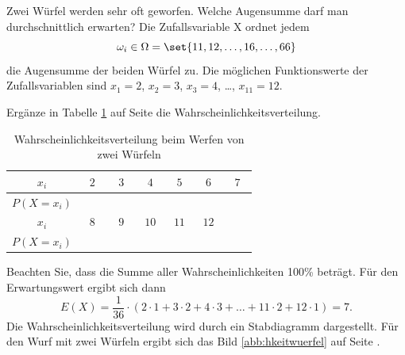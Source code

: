 \documentclass[%
11pt,%
twoside,%
titlepage,%
german,%
headsepline%
]{scrartcl}
\newcommand{\spaltenheight}{\rule{0mm}{3ex}}
\newcommand{\spaltensep}{\\[1ex]}
\begin{document}
\begin{bsp}
Zwei Würfel werden sehr oft geworfen. Welche Augensumme darf man durchschnittlich erwarten? Die Zufallsvariable X ordnet jedem 
$$\omega_i\in\Omega=\set{11,12,\dots,16,\dots,66}$$
die Augensumme der beiden Würfel zu. Die möglichen Funktionswerte der Zufallsvariablen sind $x_1=2$, $x_2=3$, $x_3=4$, \dots, $x_{11}=12$.

\begin{ueb}
Ergänze in Tabelle \ref{tab:wuerfeln} auf Seite \pageref{tab:wuerfeln} die Wahrscheinlichkeitsverteilung.

\begin{table}
\begin{center}
\begin{tabular}{|c|c|c|c|c|c|c|}
\hline
\rowcolor{Gray}\spaltenheight $\;\; x_i\;\;$ & $\;\;2\;\;$ & $\;\;3\;\;$ & $\;\;4\;\;$ & $\;\;5\;\;$ & $\;\;6\;\;$ & $\;\;7\;\;$\spaltensep \hline
\rowcolor{lightyellow}\rule{0mm}{3ex} $P(X=x_i)$ &  & & & & & \\[3ex] \hline
\rowcolor{Gray}\spaltenheight $\;\; x_i\;\;$ & $\;\;8\;\;$ & $\;\;9\;\;$ & $\;10\;$ & $\;11\;$ & $\;12\;$ & \phantom{$\;12\;$}\spaltensep \hline
\rowcolor{lightyellow}\rule{0mm}{3ex} $P(X=x_i)$ &  & & & & & \\[3ex] \hline
\end{tabular}
\end{center}
\caption{Wahrscheinlichkeitsverteilung beim Werfen von zwei Würfeln}\label{tab:wuerfeln}
\end{table}
\end{ueb}

Beachten Sie, dass die Summe aller Wahrscheinlichkeiten 100\% beträgt. Für den Erwartungswert ergibt sich dann
$$E(X) = \frac{1}{36}\cdot(2\cdot1 + 3\cdot2 + 4\cdot3 + \ldots + 11\cdot2 + 12\cdot1) = 7.$$
Die	Wahrscheinlichkeitsverteilung wird durch ein Stabdiagramm dargestellt. Für den Wurf mit zwei Würfeln ergibt sich das Bild \ref{abb:hkeitwuerfel} auf Seite \pageref{abb:hkeitwuerfel}.


\end{bsp}
\end{document}

